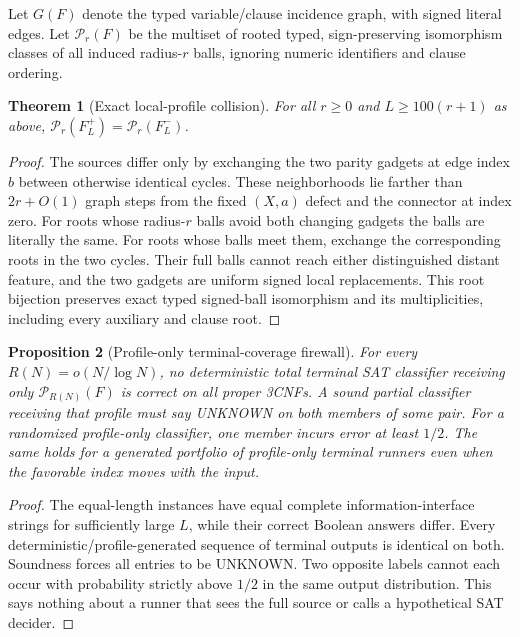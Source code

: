 \documentclass[11pt]{article}
\newtheorem{theorem}{Theorem}
\newtheorem{proposition}[theorem]{Proposition}
\begin{document}
Let $G(F)$ denote the typed variable/clause incidence graph, with signed literal edges. Let $\mathcal P_r(F)$ be the multiset of rooted typed, sign-preserving isomorphism classes of all induced radius-$r$ balls, ignoring numeric identifiers and clause ordering.
\begin{theorem}[Exact local-profile collision]
For all $r\ge0$ and $L\ge100(r+1)$ as above,
$\mathcal P_r(F_L^+)=\mathcal P_r(F_L^-)$.
\end{theorem}
\begin{proof}
The sources differ only by exchanging the two parity gadgets at edge index $b$ between otherwise identical cycles. These neighborhoods lie farther than $2r+O(1)$ graph steps from the fixed $(X,a)$ defect and the connector at index zero. For roots whose radius-$r$ balls avoid both changing gadgets the balls are literally the same. For roots whose balls meet them, exchange the corresponding roots in the two cycles. Their full balls cannot reach either distinguished distant feature, and the two gadgets are uniform signed local replacements. This root bijection preserves exact typed signed-ball isomorphism and its multiplicities, including every auxiliary and clause root.
\end{proof}

\begin{proposition}[Profile-only terminal-coverage firewall]
For every $R(N)=o(N/\log N)$, no deterministic total terminal SAT classifier receiving only $\mathcal P_{R(N)}(F)$ is correct on all proper 3CNFs. A sound partial classifier receiving that profile must say UNKNOWN on both members of some pair. For a randomized profile-only classifier, one member incurs error at least $1/2$. The same holds for a generated portfolio of profile-only terminal runners even when the favorable index moves with the input.
\end{proposition}
\begin{proof}
The equal-length instances have equal complete information-interface strings for sufficiently large $L$, while their correct Boolean answers differ. Every deterministic/profile-generated sequence of terminal outputs is identical on both. Soundness forces all entries to be UNKNOWN. Two opposite labels cannot each occur with probability strictly above $1/2$ in the same output distribution. This says nothing about a runner that sees the full source or calls a hypothetical SAT decider.
\end{proof}
\end{document}
